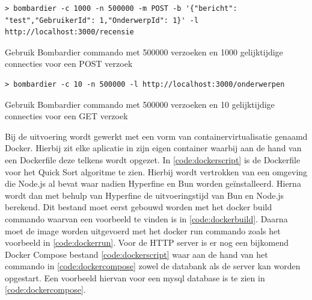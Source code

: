\begin{listing}[H]
  \centering
  \begin{verbatim}
> bombardier -c 1000 -n 500000 -m POST -b '{"bericht": "test","GebruikerId": 1,"OnderwerpId": 1}' -l http://localhost:3000/recensie
      \end{verbatim}
      \caption{\label{code:Bombardier1000}Gebruik Bombardier commando met 500000 verzoeken en 1000 gelijktijdige connecties voor een POST verzoek}
\end{listing}
\begin{listing}[H]
  \centering
  \begin{verbatim}
> bombardier -c 10 -n 500000 -l http://localhost:3000/onderwerpen
      \end{verbatim}
      \caption{\label{code:Bombardier10GET}Gebruik Bombardier commando met 500000 verzoeken en 10 gelijktijdige connecties voor een GET verzoek}
\end{listing}
Bij de uitvoering wordt gewerkt met een vorm van containervirtualisatie genaamd Docker.
Hierbij zit elke aplicatie in zijn eigen container waarbij aan de hand van een Dockerfile deze telkens wordt opgezet.
In \ref{code:dockerscript} is de Dockerfile voor het Quick Sort algoritme te zien. 
Hierbij wordt vertrokken van een omgeving die Node.js al bevat waar nadien Hyperfine en Bun worden geïnstalleerd.
Hierna wordt dan met behulp van Hyperfine de uitvoeringstijd van Bun en Node.js berekend.
Dit bestand moet eerst gebouwd worden met het docker build commando waarvan een voorbeeld te vinden is in \ref{code:dockerbuild}.
Daarna moet de image worden uitgevoerd met het docker run commando zoals het voorbeeld in \ref{code:dockerrun}.
Voor de HTTP server is er nog een bijkomend
Docker Compose bestand \ref{code:dockerscript} waar aan de hand van het commando in \ref{code:dockercompose}
zowel de databank als de server kan worden opgestart. Een voorbeeld hiervan voor een mysql database is te zien in \ref{code:dockercompose}.
